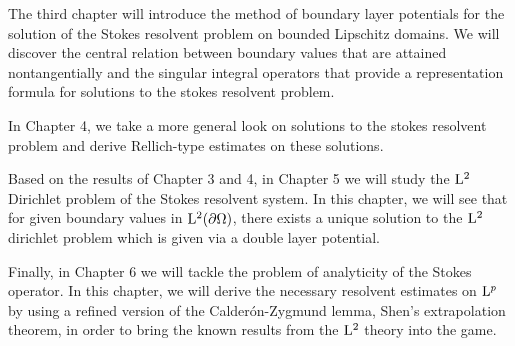 The third chapter will introduce the method of boundary layer potentials for the solution of the Stokes resolvent problem on bounded Lipschitz domains.
We will discover the central relation between boundary values that are attained nontangentially and the singular integral operators that provide a representation formula for solutions to the stokes resolvent problem. 

In Chapter 4, we take a more general look on solutions to the stokes resolvent problem and derive Rellich-type estimates on these solutions.

Based on the results of Chapter 3 and 4, in Chapter 5 we will study the $\mathrm{L}^2$ Dirichlet problem of the Stokes resolvent system. In this chapter, we will see that for given boundary values in $\mathrm{L}^2(\partial\Omega)$, there exists a unique solution to the $\mathrm{L}^2$ dirichlet problem which is given via a double layer potential.

Finally, in Chapter 6 we will tackle the problem of analyticity of the Stokes operator. In this chapter, we will derive the necessary resolvent estimates on $\mathrm{L}^p$ by using a refined version of the Calder\'on-Zygmund lemma, Shen's extrapolation theorem, in order to bring the known results from the $\mathrm{L}^2$ theory into the game.



